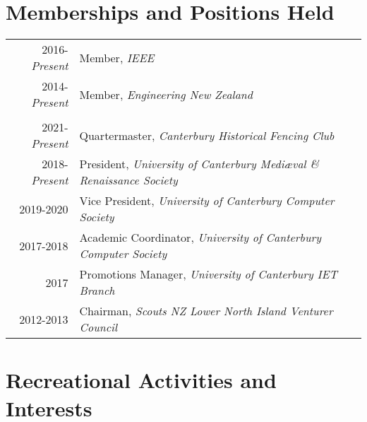 \documentclass[a4paper,10pt]{article} %
\begin{document}

\section{Memberships and Positions Held}

\begin{tabular}{rl}

2016-\emph{Present} & Member, \emph{IEEE} \\
2014-\emph{Present} & Member, \emph{Engineering New Zealand} \\
&\\
2021-\emph{Present} & Quartermaster, \emph{Canterbury Historical Fencing Club} \\
2018-\emph{Present} & President, \emph{University of Canterbury Medi\ae val \& Renaissance Society} \\
2019-2020 & Vice President, \emph{University of Canterbury Computer Society} \\
2017-2018 & Academic Coordinator, \emph{University of Canterbury Computer Society} \\
2017 & Promotions Manager, \emph{University of Canterbury IET Branch} \\
2012-2013 & Chairman, \emph{Scouts NZ Lower North Island Venturer Council} \\


\end{tabular}



\vspace{5mm}


\section{Recreational Activities and Interests}
\end{document}
